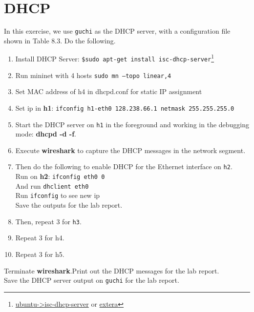 \documentclass[10pt,a4paper]{article}
\numberwithin{equation}{section}
\numberwithin{figure}{section}
\numberwithin{table}{section}
\begin{document}
    \section*{DHCP}
    In this exercise, we use \texttt{guchi} as the DHCP server, with a configuration file shown in Table 8.3. Do the following.
    \begin{enumerate}
        \item Install DHCP Server: \texttt{\$sudo apt-get install isc-dhcp-server}\footnote{\href{https://help.ubuntu.com/community/isc-dhcp-server}{ubuntu->isc-dhcp-server} or \href{https://www.tecmint.com/install-dhcp-server-in-ubuntu-debian/}{extera}}
        \item Run mininet with 4 hosts \texttt{sudo mn --topo linear,4}
        \item Set MAC address of h4 in dhcpd.conf for static IP assignment
        \item Set ip in \textbf{h1}: \texttt{ifconfig h1-eth0 128.238.66.1 netmask 255.255.255.0}
        \item Start the DHCP server on \texttt{h1} in the foreground and working in the debugging mode: \textbf{dhcpd -d -f}.
        \item Execute \textbf{wireshark} to capture the DHCP messages in the network segment.
        \item Then do the following to enable DHCP for the Ethernet interface on \texttt{h2}. \\
        Run on \textbf{h2}: \texttt{ifconfig eth0 0}\\
        And run \texttt{dhclient eth0}\\
        Run \texttt{ifconfig} to see new ip\\
        Save the outputs for the lab report.
        \item Then, repeat 3 for \texttt{h3}.
        \item Repeat 3 for h4.
        \item Repeat 3 for h5.
    \end{enumerate}
    Terminate \textbf{wireshark}.Print out the DHCP messages for the lab report. \\
    Save the DHCP server output on \texttt{guchi} for the lab report.
\end{document}
